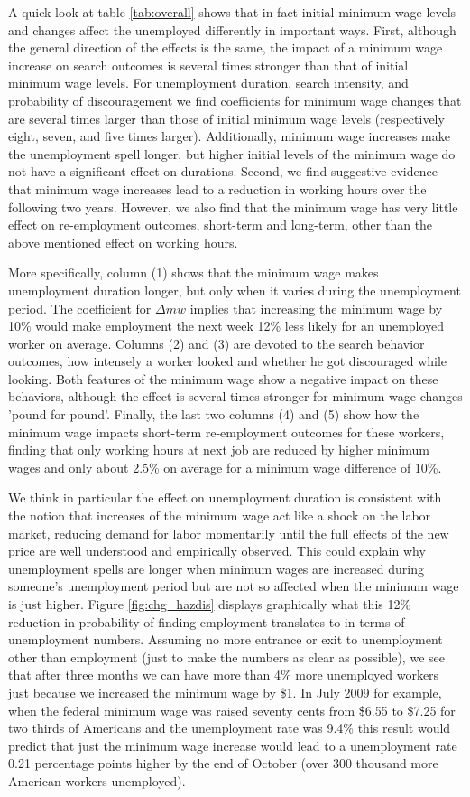 \documentclass{article}
\begin{document}
A quick look at table \ref{tab:overall} shows that in fact initial minimum wage levels and changes affect the unemployed differently in important ways. First, although the general direction of the effects is the same, the impact of a minimum wage increase on search outcomes is several times stronger than that of initial minimum wage levels. For unemployment duration, search intensity, and probability of discouragement we find coefficients for minimum wage changes that are several times larger than those of initial minimum wage levels (respectively eight, seven, and five times larger). Additionally, minimum wage increases make the unemployment spell longer, but higher initial levels of the minimum wage do not have a significant effect on durations. Second, we find suggestive evidence that minimum wage increases lead to a reduction in working hours over the following two years. However, we also find that the minimum wage has very little effect on re-employment outcomes, short-term and long-term, other than the above mentioned effect on working hours. 



More specifically, column (1) shows that the minimum wage makes unemployment duration longer, but only when it varies during the unemployment period. The coefficient for $\Delta mw$ implies that increasing the minimum wage by 10\% would make employment the next week 12\% less likely for an unemployed worker on average. Columns (2) and (3) are devoted to the search behavior outcomes, how intensely a worker looked and whether he got discouraged while looking. Both features of the minimum wage show a negative impact on these behaviors, although the effect is several times stronger for minimum wage changes 'pound for pound'. Finally, the last two columns (4) and (5) show how the minimum wage impacts short-term re-employment outcomes for these workers, finding that only working hours at next job are reduced by higher minimum wages and only about 2.5\% on average for a minimum wage difference of 10\%.

We think in particular the effect on unemployment duration is consistent with the notion that increases of the minimum wage act like a shock on the labor market, reducing demand for labor momentarily until the full effects of the new price are well understood and empirically observed. This could explain why unemployment spells are longer when minimum wages are increased during someone's unemployment period but are not so affected when the minimum wage is just higher. Figure \ref{fig:chg_hazdis} displays graphically what this 12\% reduction in probability of finding employment translates to in terms of unemployment numbers. Assuming no more entrance or exit to unemployment other than employment (just to make the numbers as clear as possible), we see that after three months we can have more than 4\% more unemployed workers just because we increased the minimum wage by \$1. In July 2009 for example, when the federal minimum wage was raised seventy cents from \$6.55 to \$7.25 for two thirds of Americans and the unemployment rate was 9.4\% this result would predict that just the minimum wage increase would lead to a unemployment rate 0.21 percentage points higher by the end of October (over 300 thousand more American workers unemployed).
\end{document}
